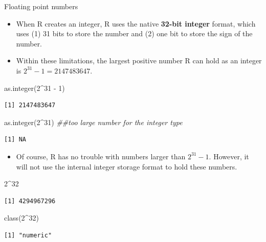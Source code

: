 \documentclass[
  9pt,
  a4paper,
  ignorenonframetext,
  notheorems]{beamer}
\newenvironment{Shaded}{\begin{snugshade}}{\end{snugshade}}
\newcommand{\DecValTok}[1]{\textcolor[rgb]{0.68,0.00,0.00}{#1}}
\newcommand{\DocumentationTok}[1]{\textcolor[rgb]{0.37,0.37,0.37}{\textit{#1}}}
\newcommand{\FunctionTok}[1]{\textcolor[rgb]{0.28,0.35,0.67}{#1}}
\newcommand{\NormalTok}[1]{\textcolor[rgb]{0.00,0.23,0.31}{#1}}
\newcommand{\SpecialCharTok}[1]{\textcolor[rgb]{0.37,0.37,0.37}{#1}}
\providecommand{\tightlist}{%
  \setlength{\itemsep}{0pt}\setlength{\parskip}{0pt}}\usepackage{longtable,booktabs,array}
\begin{document}
\begin{frame}[fragile]{Floating point numbers}
\protect\hypertarget{floating-point-numbers}{}
\begin{itemize}
\item
  When R creates an integer, R uses the native \textbf{32-bit integer}
  format, which uses (1) 31 bits to store the number and (2) one bit to
  store the sign of the number.
\item
  Within these limitations, the largest positive number R can hold as an
  integer is \(2^31-1=2147483647\).
\end{itemize}

\begin{Shaded}
\begin{Highlighting}[]
\FunctionTok{as.integer}\NormalTok{(}\DecValTok{2}\SpecialCharTok{\^{}}\DecValTok{31} \SpecialCharTok{{-}} \DecValTok{1}\NormalTok{)}
\end{Highlighting}
\end{Shaded}

\begin{verbatim}
[1] 2147483647
\end{verbatim}

\begin{Shaded}
\begin{Highlighting}[]
\FunctionTok{as.integer}\NormalTok{(}\DecValTok{2}\SpecialCharTok{\^{}}\DecValTok{31}\NormalTok{) }\DocumentationTok{\#\#too large number for the integer type}
\end{Highlighting}
\end{Shaded}

\begin{verbatim}
[1] NA
\end{verbatim}

\begin{itemize}
\tightlist
\item
  Of course, R has no trouble with numbers larger than \(2^{31}-1\).
  However, it will not use the internal integer storage format to hold
  these numbers.
\end{itemize}

\begin{Shaded}
\begin{Highlighting}[]
\DecValTok{2}\SpecialCharTok{\^{}}\DecValTok{32}
\end{Highlighting}
\end{Shaded}

\begin{verbatim}
[1] 4294967296
\end{verbatim}

\begin{Shaded}
\begin{Highlighting}[]
\FunctionTok{class}\NormalTok{(}\DecValTok{2}\SpecialCharTok{\^{}}\DecValTok{32}\NormalTok{)}
\end{Highlighting}
\end{Shaded}

\begin{verbatim}
[1] "numeric"
\end{verbatim}
\end{frame}
\end{document}
